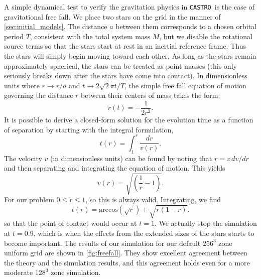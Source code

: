 \documentclass[iop]{../emulateapj}
\newcommand{\castro}{\texttt{CASTRO}}
\begin{document}
A simple dynamical test to verify the gravitation physics in \castro\ is
the case of gravitational free fall. We place two stars on the grid 
in the manner of \autoref{sec:initial_models}. The distance $a$ between 
them corresponds to a chosen orbital period $T$, consistent with the total
system mass $M$, but we disable the rotational source terms so that 
the stars start at rest in an inertial reference frame. 
Thus the stars will simply begin moving toward each other.
As long as the stars remain approximately spherical, the stars can be 
treated as point masses (this only seriously breaks down after the stars
have come into contact). In dimensionless units where $r \to r / a$ and 
$t \to 2\sqrt{2}\pi t / T$, the simple free fall equation of motion governing the
distance $r$ between their centers of mass takes the form:
\begin{equation}
  \ddot{r}(t) = - \frac{1}{2r^2}.
\end{equation}
It is possible to derive a closed-form solution for the evolution time
as a function of separation by starting with the integral formulation,
\begin{equation}
  t(r) = \int_{1}^{r} \frac{dr}{v(r)}.
\end{equation}
The velocity $v$ (in dimensionless units) can be found by noting that 
$\ddot{r} = v\, dv / dr$ and then separating and integrating the equation 
of motion. This yields 
\begin{equation}
  v(r) = \sqrt{\left(\frac{1}{r} - 1\right)}.
\end{equation}
For our problem $0 \leq r \leq 1$, so this is always valid. Integrating, we find
\begin{equation}
  t(r) = \text{arccos}\left(\sqrt{r}\right) + \sqrt{r \left(1 - r\right)}. \label{analyticalFreeFall}
\end{equation}
so that the point of contact would occur at $t = 1$. We actually stop the simulation
at $t = 0.9$, which is when the effects from the extended sizes of the stars
starts to become important. The results of our simulation for our default $256^3$ zone 
uniform grid are shown in \autoref{fig:freefall}. They show excellent agreement
between the theory and the simulation results, and this agreement holds even for 
a more moderate $128^3$ zone simulation.
\end{document}
